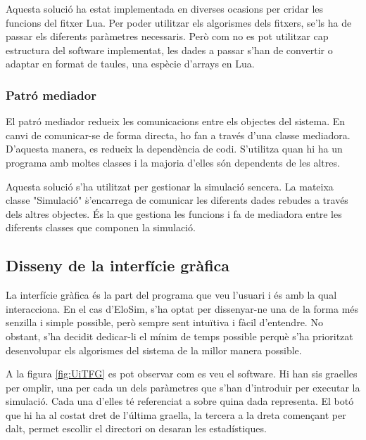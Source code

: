 \documentclass[a4paper]{article}
\begin{document}
Aquesta solució ha estat implementada en diverses ocasions per cridar les funcions del fitxer Lua. Per poder utilitzar els algorismes dels fitxers, se'ls ha de passar els diferents paràmetres necessaris. Però com no es pot utilitzar cap estructura del software implementat, les dades a passar s'han de convertir o adaptar en format de taules, una espècie d'arrays en Lua.

\subsubsection*{Patró mediador}

El patró mediador redueix les comunicacions entre els objectes del sistema. En canvi de comunicar-se de forma directa, ho fan a través d'una classe mediadora. D'aquesta manera, es redueix la dependència de codi. S'utilitza quan hi ha un programa amb moltes classes i la majoria d'elles són dependents de les altres.

Aquesta solució s'ha utilitzat per gestionar la simulació sencera. La mateixa classe "Simulació" \. s'encarrega de comunicar les diferents dades rebudes a través dels altres objectes. És la que gestiona les funcions i fa de mediadora entre les diferents classes que componen la simulació.

\subsection{Disseny de la interfície gràfica}

La interfície gràfica és la part del programa que veu l'usuari i és amb la qual interacciona. En el cas d'EloSim, s'ha optat per dissenyar-ne una de la forma més senzilla i simple possible, però sempre sent intuïtiva i fàcil d'entendre. No obstant, s'ha decidit dedicar-li el mínim de temps possible perquè s'ha prioritzat desenvolupar els algorismes del sistema de la millor manera possible. 

A la figura \ref{fig:UiTFG} es pot observar com es veu el software. Hi han sis graelles per omplir, una per cada un dels paràmetres que s'han d'introduir per executar la simulació. Cada una d'elles té referenciat a sobre quina dada representa. El botó que hi ha al costat dret de l'última graella, la tercera a la dreta començant per dalt, permet escollir el directori on desaran les estadístiques.
\end{document}
